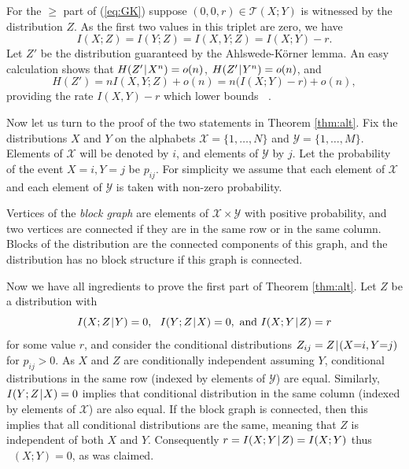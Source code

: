\documentclass{IEEEtran}
\newcommand\T{\mathcal{T}}
\DeclareMathOperator\GK{C_{\mathsf{GK}}}
\newcommand\I{I\xspace}
\renewcommand\H{H\xspace}
\def\|{\mkern 1.4mu\mathord{|}\mkern 1.4mu}
\renewcommand{\ge}{\geqslant}
\begin{document}
For the $\ge$ part of (\ref{eq:GK}) suppose $(0,0,r)\in \T(X;Y)$ is
witnessed by the distribution $Z$. As the first two values in this triplet
are zero, we have
$$
  \I(X;Z)=\I(Y;Z)=\I(X,Y;Z)=\I(X;Y)-r.
$$
Let $Z'$ be the distribution guaranteed by the Ahlswede-K\"orner lemma. An
easy calculation shows that $\H(Z'\|X^n)=o(n)$, $\H(Z'\|Y^n)=o(n)$, and
$$
   \H(Z')=n\I(X,Y;Z)+o(n)= n\big(\I(X;Y)-r\big)+o(n),
$$
providing the rate $\I(X,Y)-r$ which lower bounds $\GK$.

\medskip

Now let us turn to the proof of the two statements in Theorem \ref{thm:alt}.
Fix the distributions $X$ and $Y$ on the alphabets $\mathcal
X=\{1,\dots,N\}$ and $\mathcal Y=\{1,\dots, M\}$. Elements of $\mathcal X$
will be denoted by $i$, and elements of $\mathcal Y$ by $j$. Let the probability
of the event $X{=}i, Y{=}j$ be $p_{ij}$. For simplicity we assume that each
element of $\mathcal X$ and each element of $\mathcal Y$ is taken with
non-zero probability.

Vertices of the \emph{block graph} are elements of $\mathcal X \times \mathcal
Y$ with positive probability, and two vertices are connected if they are in
the same row or in the same column. Blocks of the distribution are the
connected components of this graph, and the distribution has no block
structure if this graph is connected.

Now we have all ingredients to prove the first part of Theorem \ref{thm:alt}.
Let $Z$ be a distribution with
$$
   \I(X;Z\|Y)=0, ~~\I(Y;Z\|X)=0, \mbox{ and } \I(X;Y\|Z)=r
$$
for some value $r$, and consider the conditional distributions $Z_{ij} = Z
\|(X{=}i,Y{=}j)$ for $p_{ij}>0$. As $X$ and $Z$ are conditionally
independent assuming $Y$, conditional distributions in the same row (indexed
by elements of $\mathcal Y$) are equal. Similarly, $\I(Y;Z\|X)=0$ implies
that conditional distribution in the same column (indexed by elements of
$\mathcal X$) are also equal. If the block graph is connected, then this implies
that all conditional distributions are the same, meaning that $Z$ is
independent of both $X$ and $Y$. Consequently $r=\I(X;Y\|Z)=\I(X;Y)$ thus
$\GK(X;Y)=0$, as was claimed.
\end{document}
